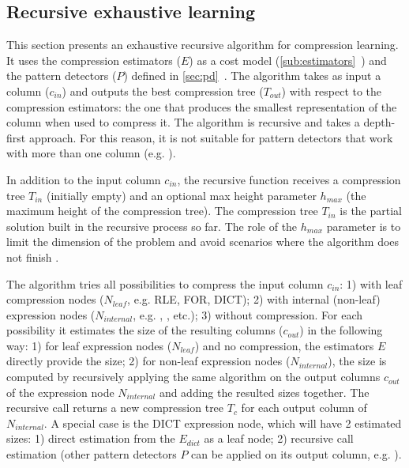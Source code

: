 \subsection{Recursive exhaustive learning}
\label{sub:learning:recursiveexhaustive}





% 

This section presents an exhaustive recursive algorithm for compression learning. It uses the compression estimators (\(E\)) as a cost model (\ref{sub:estimators}~) and the pattern detectors (\(P\)) defined in \ref{sec:pd}~. The algorithm takes as input a column (\(c_{in}\)) and outputs the best compression tree (\(T_{out}\)) with respect to the compression estimators: the one that produces the smallest representation of the column when used to compress it. The algorithm is recursive and takes a depth-first approach. For this reason, it is not suitable for pattern detectors that work with more than one column (e.g. ).

In addition to the input column \(c_{in}\), the recursive function receives a compression tree \(T_{in}\) (initially empty) and an optional max height parameter \(h_{max}\) (the maximum height of the compression tree). The compression tree \(T_{in}\) is the partial solution built in the recursive process so far. The role of the \(h_{max}\) parameter is to limit the dimension of the problem and avoid scenarios where the algorithm does not finish .

The algorithm tries all possibilities to compress the input column \(c_{in}\): 1) with leaf compression nodes (\(N_{leaf}\), e.g. RLE, FOR, DICT); 2) with internal (non-leaf) expression nodes (\(N_{internal}\), e.g. , , etc.); 3) without compression. For each possibility it estimates the size of the resulting columns (\(c_{out}\)) in the following way: 1) for leaf expression nodes (\(N_{leaf}\)) and no compression, the estimators \(E\) directly provide the size; 2) for non-leaf expression nodes (\(N_{internal}\)), the size is computed by recursively applying the same algorithm on the output columns \(c_{out}\) of the expression node \(N_{internal}\) and adding the resulted sizes together. The recursive call returns a new compression tree \(T_{c}\) for each output column of \(N_{internal}\). A special case is the DICT expression node, which will have 2 estimated sizes: 1) direct estimation from the  \(E_{dict}\) as a leaf node; 2) recursive call estimation (other pattern detectors \(P\) can be applied on its output column, e.g. ).

